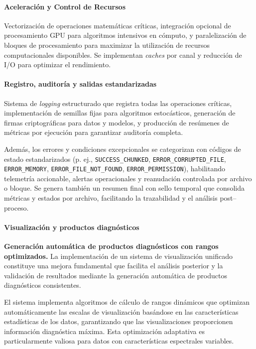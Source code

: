\paragraph{Aceleración y Control de Recursos}

Vectorización de operaciones matemáticas críticas, integración opcional de procesamiento GPU para algoritmos intensivos en cómputo, y paralelización de bloques de procesamiento para maximizar la utilización de recursos computacionales disponibles. Se implementan \textit{caches} por canal y reducción de I/O para optimizar el rendimiento.

\paragraph{Registro, auditoría y salidas estandarizadas}

Sistema de \emph{logging} estructurado que registra todas las operaciones críticas, implementación de semillas fijas para algoritmos estocásticos, generación de firmas criptográficas para datos y modelos, y producción de resúmenes de métricas por ejecución para garantizar auditoría completa.

Además, los errores y condiciones excepcionales se categorizan con códigos de estado estandarizados (p. ej., \texttt{SUCCESS\_CHUNKED}, \texttt{ERROR\_CORRUPTED\_FILE}, \texttt{ERROR\_MEMORY}, \texttt{ERROR\_FILE\_NOT\_FOUND}, \texttt{ERROR\_PERMISSION}), habilitando telemetría accionable, alertas operacionales y reanudación controlada por archivo o bloque. Se genera también un resumen final con sello temporal que consolida métricas y estados por archivo, facilitando la trazabilidad y el análisis post--proceso.

\paragraph{Visualización y productos diagnósticos}

\noindent\textbf{Generación automática de productos diagnósticos con rangos optimizados.} La implementación de un sistema de visualización unificado constituye una mejora fundamental que facilita el análisis posterior y la validación de resultados mediante la generación automática de productos diagnósticos consistentes.

El sistema implementa algoritmos de cálculo de rangos dinámicos que optimizan automáticamente las escalas de visualización basándose en las características estadísticas de los datos, garantizando que las visualizaciones proporcionen información diagnóstica máxima. Esta optimización adaptativa es particularmente valiosa para datos con características espectrales variables.

